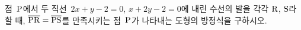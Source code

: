점~$\mathrm{P}$에서 두 직선~$2x+y-2=0$, $x+2y-2=0$에 내린 수선의 발을 각각 $\mathrm{R}$, $\mathrm{S}$라 할 때, $\overline{\mathrm{PR}}=\overline{\mathrm{PS}}$를 만족시키는 점~$\mathrm{P}$가 나타내는 도형의 방정식을 구하시오. 
